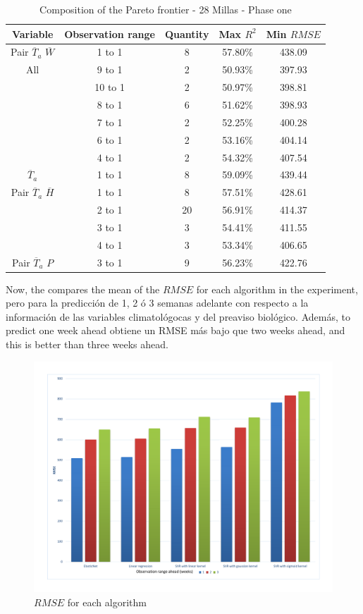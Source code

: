 \begin{table}[h] 
\caption{Composition of the Pareto frontier - 28 Millas - Phase one} 
\label{tabla4} 
\centering
\begin{tabular}{c|c|c|c|c} 
\hline
\bfseries Variable & \bfseries Observation range & \bfseries Quantity & \bfseries Max $R^2$ & \bfseries Min $RMSE$\\ 
\hline\hline 
Pair $\overline{T}_{a}$ $\overline{W}$ & 1 to 1 & 8 & 57.80\% & 438.09 \\
\hline 
All   &	9 to 1 & 2 & 50.93\% & 397.93 \\
  & 10 to 1	 & 2 & 50.97\% & 398.81 \\
  &	8 to 1 & 6 & 51.62\% & 398.93 \\
  &	7 to 1 & 2 & 52.25\% & 400.28 \\
  &	6 to 1 & 2 & 53.16\% & 404.14 \\
  &	4 to 1 & 2 & 54.32\% & 407.54 \\
\hline    
$\overline{T}_{a}$ & 1 to 1  & 8  & 59.09\% & 439.44 \\
\hline
Pair $\overline{T}_{a}$ $\overline{H}$ & 1 to 1	 & 8 & 57.51\% & 428.61 \\
 &	2 to 1 & 20 & 56.91\% & 414.37 \\
 &	3 to 1 & 3 & 54.41\% & 411.55 \\
 &	4 to 1 & 3 & 53.34\% & 406.65 \\
\hline
Pair $\overline{T}_{a}$ $P$ & 3 to 1 & 9 & 56.23\% & 422.76 \\
\hline
\end{tabular} 
\end{table}



Now, the  compares the mean of the $RMSE$ for each algorithm in the experiment, pero para la predicción de 1, 2 ó 3 semanas adelante con respecto a la información de las variables climatológocas y del preaviso biológico. Además, to predict one week ahead obtiene un RMSE más bajo que  two weeks ahead, and this is better than three weeks ahead. 
%
\begin{figure}[H] 
 \centering
 \includegraphics[scale=.5]{Usado_Algorithms-RMSE}
 \caption{$RMSE$ for each algorithm} 
 \label{figura5} 
\end{figure}

